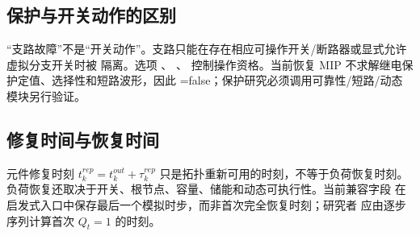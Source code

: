 \subsection{保护与开关动作的区别}
“支路故障”不是“开关动作”。支路只能在存在相应可操作开关/断路器或显式允许虚拟分支开关时被
隔离。选项 、
、
控制操作资格。当前恢复 MIP 不求解继电保护定值、选择性和短路波形，因此
=false；保护研究必须调用可靠性/短路/动态模块另行验证。

\subsection{修复时间与恢复时间}
元件修复时刻 $t_k^{rep}=t_k^{out}+\tau_k^{rep}$ 只是拓扑重新可用的时刻，不等于负荷恢复时刻。
负荷恢复还取决于开关、根节点、容量、储能和动态可执行性。当前兼容字段
 在启发式入口中保存最后一个模拟时步，而非首次完全恢复时刻；研究者
应由逐步  序列计算首次 $Q_t=1$ 的时刻。
